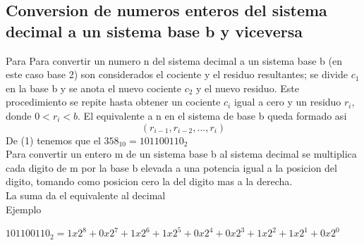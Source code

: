 \documentclass{article}
\begin{document}
\begin{multicols}{2}
\section{Conversion de numeros enteros del sistema decimal a un sistema base b y viceversa}
\label{sec:Conversion de numeros enteros del sistema decimal a un sistema base b y viceversa}
Para Para convertir un numero n del sistema  decimal a un sistema base b (en este caso base 2) son considerados el cociente y el residuo resultantes; se divide $c_{1}$ en la base b y se anota el nuevo cociente $c_{2}$ y el nuevo residuo. Este procedimiento se repite hasta obtener un cociente $c_{i}$ igual a cero y un residuo $r_{i}$, donde $0<r_{i}<b$. El equivalente a n en el sistema de base b queda formado asi
\\
\begin{equation}
(r_{i-1},r_{i-2},...,r_{i})
\end{equation}
De (1) tenemos que el $358_{10} = 101100110_{2}$
\\
Para convertir un entero m de un sistema base b al sistema decimal se multiplica cada digito de m por la base b elevada a una potencia igual a la posicion del digito, tomando como posicion cero la del digito mas a la derecha.\\
La suma da el equivalente al decimal\\
Ejemplo
\begin{center}
$101100110_{2}=1x2^{8}+0x2^{7}+1x2^{6}+1x2^{5}
+0x2^{4}+0x2^{3}+1x2^{2}+1x2^{1}+0x2^{0}$   
\end{center}


\end{multicols}
\end{document}
